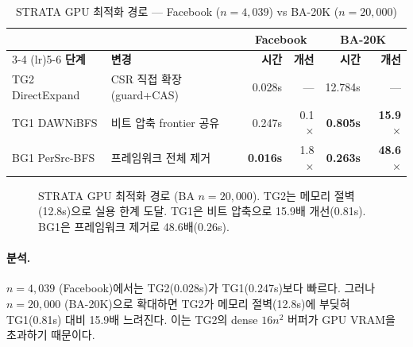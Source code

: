 \documentclass[11pt,a4paper]{article}
\begin{document}
\begin{table}[H]\centering
\caption{STRATA GPU 최적화 경로 --- Facebook ($n\!=\!4{,}039$) vs BA-20K ($n\!=\!20{,}000$)}
\label{tab:convergence}
\small
\begin{tabular}{@{}llrrrr@{}}
\toprule
 & & \multicolumn{2}{c}{\textbf{Facebook}} & \multicolumn{2}{c}{\textbf{BA-20K}} \\
\cmidrule(lr){3-4} \cmidrule(lr){5-6}
\textbf{단계} & \textbf{변경} & \textbf{시간} & \textbf{개선} & \textbf{시간} & \textbf{개선} \\
\midrule
TG2 DirectExpand & CSR 직접 확장 (guard+CAS) & 0.028s & --- & 12.784s & --- \\
TG1 DAWNiBFS & 비트 압축 frontier 공유 & 0.247s & 0.1$\times$ & \textbf{0.805s} & \textbf{15.9$\times$} \\
BG1 PerSrc-BFS & 프레임워크 전체 제거 & \textbf{0.016s} & 1.8$\times$ & \textbf{0.263s} & \textbf{48.6$\times$} \\
\bottomrule
\end{tabular}
\end{table}

\begin{figure}[H]
\centering
{}
\caption{STRATA GPU 최적화 경로 (BA $n\!=\!20{,}000$). TG2는 메모리 절벽(12.8s)으로 실용 한계 도달. TG1은 비트 압축으로 15.9배 개선(0.81s). BG1은 프레임워크 제거로 48.6배(0.26s).}
\label{fig:convergence}
\end{figure}

\paragraph{분석.}
$n = 4{,}039$ (Facebook)에서는 TG2(0.028s)가 TG1(0.247s)보다 빠르다. 그러나 $n = 20{,}000$ (BA-20K)으로 확대하면 TG2가 메모리 절벽(12.8s)에 부딪혀 TG1(0.81s) 대비 15.9배 느려진다. 이는 TG2의 dense $16n^2$ 버퍼가 GPU VRAM을 초과하기 때문이다.
\end{document}
